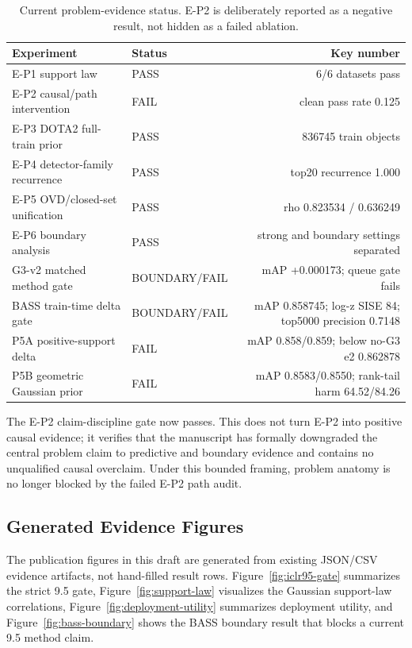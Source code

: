 \documentclass[10pt]{article}
\begin{document}
\begin{table}[h]
\centering
\small
\begin{tabular}{llr}
\toprule
Experiment & Status & Key number \\
\midrule
E-P1 support law & PASS & 6/6 datasets pass \\
E-P2 causal/path intervention & FAIL & clean pass rate 0.125 \\
E-P3 DOTA2 full-train prior & PASS & 836745 train objects \\
E-P4 detector-family recurrence & PASS & top20 recurrence 1.000 \\
E-P5 OVD/closed-set unification & PASS & rho 0.823534 / 0.636249 \\
E-P6 boundary analysis & PASS & strong and boundary settings separated \\
G3-v2 matched method gate & BOUNDARY/FAIL & mAP +0.000173; queue gate fails \\
BASS train-time delta gate & BOUNDARY/FAIL & mAP 0.858745; log-z SISE 84; top5000 precision 0.7148 \\
P5A positive-support delta & FAIL & mAP 0.858/0.859; below no-G3 e2 0.862878 \\
P5B geometric Gaussian prior & FAIL & mAP 0.8583/0.8550; rank-tail harm 64.52/84.26 \\
\bottomrule
\end{tabular}
\caption{Current problem-evidence status.  E-P2 is deliberately reported as a
negative result, not hidden as a failed ablation.}
\end{table}

The E-P2 claim-discipline gate now passes.  This does not turn E-P2 into
positive causal evidence; it verifies that the manuscript has formally
downgraded the central problem claim to predictive and boundary evidence and
contains no unqualified causal overclaim.  Under this bounded framing, problem
anatomy is no longer blocked by the failed E-P2 path audit.

\subsection{Generated Evidence Figures}

The publication figures in this draft are generated from existing JSON/CSV
evidence artifacts, not hand-filled result rows.  Figure~\ref{fig:iclr95-gate}
summarizes the strict 9.5 gate, Figure~\ref{fig:support-law} visualizes the
Gaussian support-law correlations, Figure~\ref{fig:deployment-utility}
summarizes deployment utility, and Figure~\ref{fig:bass-boundary} shows the
BASS boundary result that blocks a current 9.5 method claim.
\end{document}
